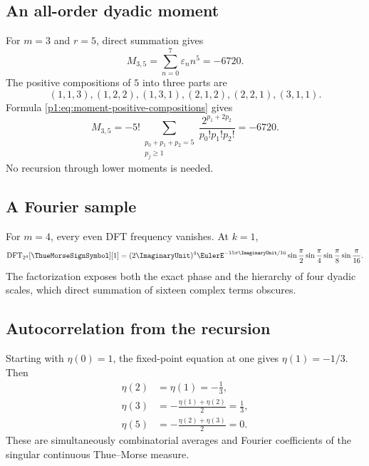 \documentclass[11pt,oneside]{article}
\numberwithin{equation}{section}
\theoremstyle{definition}
\theoremstyle{remark}
\newcommand{\eps}{\varepsilon}
\newcommand{\ThueMorseDFTCoefficient}[2]{%
  \operatorname{DFT}_{2^{#1}}\!\left[\ThueMorseSignSymbol\right]\!\left[#2\right]%
}
\begin{document}
\subsection{An all-order dyadic moment}

For \(m=3\) and \(r=5\), direct summation gives
\begin{equation}
  M_{3,5}=\sum_{n=0}^{7}\eps_nn^5=-6720.
  \label{p1:eq:example-moment-direct}
\end{equation}
The positive compositions of \(5\) into three parts are
\[
 (1,1,3),(1,2,2),(1,3,1),(2,1,2),(2,2,1),(3,1,1).
\]
Formula \eqref{p1:eq:moment-positive-compositions} gives
\begin{equation}
  M_{3,5}
  =-5!\sum_{\substack{p_0+p_1+p_2=5\\p_j\ge1}}
     \frac{2^{p_1+2p_2}}{p_0!p_1!p_2!}
  =-6720.
  \label{p1:eq:example-moment-composition}
\end{equation}
No recursion through lower moments is needed.

\subsection{A Fourier sample}

For \(m=4\), every even DFT frequency vanishes.  At \(k=1\),
\begin{equation}
  \ThueMorseDFTCoefficient{4}{1}
  =(2\ImaginaryUnit)^4\EulerE^{-15\pi\ImaginaryUnit/16}
  \sin\frac\pi2\sin\frac\pi4
  \sin\frac\pi8\sin\frac\pi{16}.
  \label{p1:eq:example-Fourier}
\end{equation}
The factorization exposes both the exact phase and the hierarchy of four
dyadic scales, which direct summation of sixteen complex terms obscures.

\subsection{Autocorrelation from the recursion}

Starting with \(\eta(0)=1\), the fixed-point equation at one gives
\(\eta(1)=-1/3\).  Then
\begin{align*}
 \eta(2)&=\eta(1)=-\frac13,\\
 \eta(3)&=-\frac{\eta(1)+\eta(2)}2=\frac13,\\
 \eta(5)&=-\frac{\eta(2)+\eta(3)}2=0.
\end{align*}
These are simultaneously combinatorial averages and Fourier coefficients of
the singular continuous Thue--Morse measure.
\end{document}
